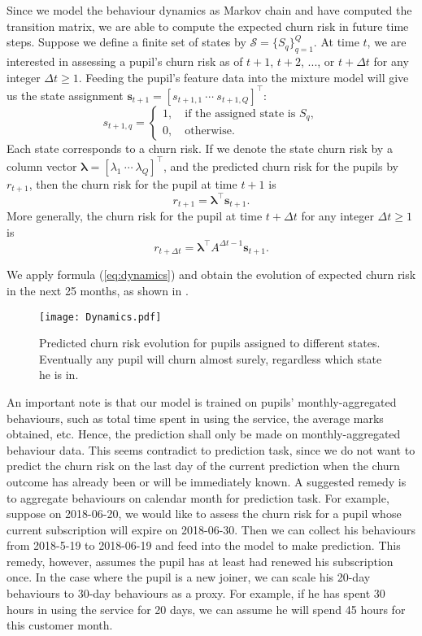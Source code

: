 Since we model the behaviour dynamics as Markov chain and have computed the transition matrix, we are able to compute the expected churn risk in future time steps. Suppose we define a finite set of states by $\mathcal{S} = \{S_q\}_{q=1}^Q$. At time $t$, we are interested in assessing a pupil's churn risk as of $t+1$, $t+2$, ..., or $t+\Delta t$ for any integer $\Delta t \geq 1$. Feeding the pupil's feature data into the mixture model will give us the state assignment $\mathbf{s}_{t+1} = [s_{t+1,1} ~\cdots ~s_{t+1,Q}]^\top $:
\begin{equation}
s_{t+1,q} = 
	\begin{cases}
	1, \quad \text{if the assigned state is } S_q, \\
	0, \quad \text{otherwise}. 
	\end{cases}
\end{equation}
Each state corresponds to a churn risk. If we denote the state churn risk by a column vector $\bm\lambda = [\lambda_1 ~\cdots ~\lambda_Q]^\top$, and the predicted churn risk for the pupils by $r_{t+1}$, then the churn risk for the pupil at time $t+1$ is
\begin{equation}
r_{t+1} = \bm\lambda^\top \mathbf{s}_{t+1}.
\end{equation}
More generally, the churn risk for the pupil at time $t+\Delta t$ for any integer $\Delta t \geq 1$ is
\begin{equation}
r_{t+\Delta t} = \bm\lambda^\top A^{\Delta t -1 } \mathbf{s}_{t+1}.
\label{eq:dynamics}
\end{equation}

We apply formula (\ref{eq:dynamics}) and obtain the evolution of expected churn risk in the next 25 months, as shown in .

\begin{figure}[!h]
\centering
\texttt{[image: Dynamics.pdf]}
\caption{Predicted churn risk evolution for pupils assigned to different states. Eventually any pupil will churn almost surely, regardless which state he is in.}
\label{fig:dynamics}
\end{figure}

An important note is that our model is trained on pupils' monthly-aggregated behaviours, such as total time spent in using the service, the average marks obtained, etc. Hence, the prediction shall only be made on monthly-aggregated behaviour data. This seems contradict to prediction task, since we do not want to predict the churn risk on the last day of the current prediction when the churn outcome has already been or will be immediately known. A suggested remedy is to aggregate behaviours on calendar month for prediction task. For example, suppose on 2018-06-20, we would like to assess the churn risk for a pupil whose current subscription will expire on 2018-06-30. Then we can collect his behaviours from 2018-5-19 to 2018-06-19 and feed into the model to make prediction. This remedy, however, assumes the pupil has at least had renewed his subscription once. In the case where the pupil is a new joiner, we can scale his 20-day behaviours to 30-day behaviours as a proxy. For example, if he has spent 30 hours in using the service for 20 days, we can assume he will spend 45 hours for this customer month.

